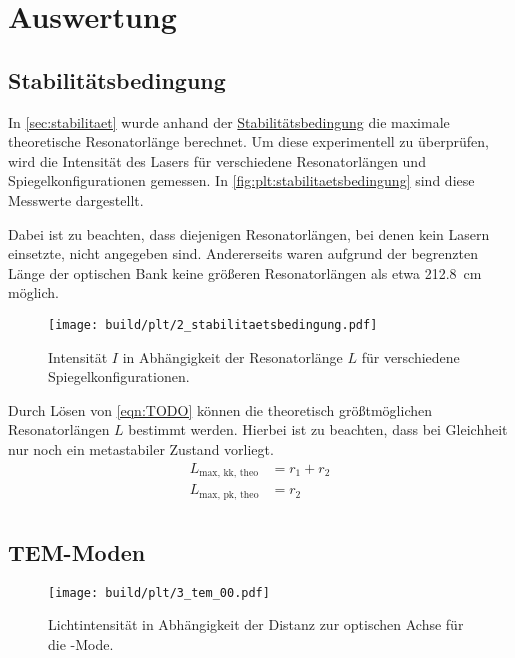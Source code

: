\section{Auswertung}
\label{sec:auswertung}

\subsection{Stabilitätsbedingung}

In \autoref{sec:stabilitaet} wurde anhand der \hyperref[eqn:stabilitaetsbedingung]{Stabilitätsbedingung} die maximale theoretische Resonatorlänge berechnet.
Um diese experimentell zu überprüfen,
wird die Intensität des Lasers für verschiedene Resonatorlängen und Spiegelkonfigurationen gemessen.
In \autoref{fig:plt:stabilitaetsbedingung} sind diese Messwerte dargestellt.

Dabei ist zu beachten, dass diejenigen Resonatorlängen, bei denen kein Lasern einsetzte, nicht angegeben sind.
Andererseits waren aufgrund der begrenzten Länge der optischen Bank keine größeren Resonatorlängen als etwa \SI{212.8}{\centi\meter} möglich.

\begin{figure}
  \centering
   \texttt{[image: build/plt/2\_stabilitaetsbedingung.pdf]}
   \caption{Intensität $I$ in Abhängigkeit der Resonatorlänge $L$ für verschiedene Spiegelkonfigurationen.}
   \label{fig:plt:stabilitaetsbedingung}
\end{figure}

Durch Lösen von \autoref{eqn:TODO} können die theoretisch größtmöglichen Resonatorlängen $L$ bestimmt werden.
Hierbei ist zu beachten, dass bei Gleichheit nur noch ein metastabiler Zustand vorliegt.
\begin{align*}
    L_\text{max, kk, theo} &= r_1 + r_2 \\
    L_\text{max, pk, theo} &= r_2 \\
\end{align*}


\subsection{TEM-Moden}
\lipsum[1]

\begin{figure}
  \centering
   \texttt{[image: build/plt/3\_tem\_00.pdf]}
   \caption{Lichtintensität in Abhängigkeit der Distanz zur optischen Achse für die -Mode.}
   \label{fig:plt:tem_00}
\end{figure}

